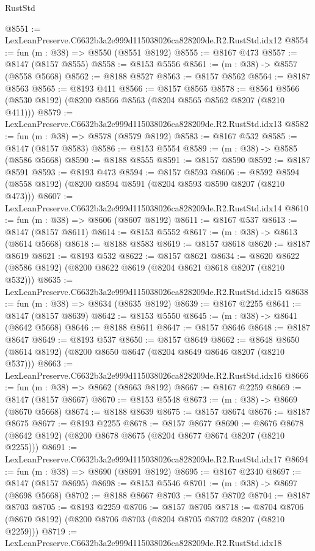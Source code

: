 \begin{lexlean}{RustStd}
\begin{coremodule}
@8551 := LexLeanPreserve.C6632b3a2e999d115038026ca828209de.R2.RustStd.idx12
@8554 := fun (m : @38) => @8550 (@8551 @8192)
@8555 := @8167 @473
@8557 := @8147 (@8157 @8555)
@8558 := @8153 @5556
@8561 := (m : @38) -> @8557 (@8558 @5668)
@8562 := @8188 @8527
@8563 := @8157 @8562
@8564 := @8187 @8563
@8565 := @8193 @411
@8566 := @8157 @8565
@8578 := @8564 @8566 (@8530 @8192) (@8200 @8566 @8563 (@8204 @8565 @8562 @8207 (@8210 @411)))
@8579 := LexLeanPreserve.C6632b3a2e999d115038026ca828209de.R2.RustStd.idx13
@8582 := fun (m : @38) => @8578 (@8579 @8192)
@8583 := @8167 @532
@8585 := @8147 (@8157 @8583)
@8586 := @8153 @5554
@8589 := (m : @38) -> @8585 (@8586 @5668)
@8590 := @8188 @8555
@8591 := @8157 @8590
@8592 := @8187 @8591
@8593 := @8193 @473
@8594 := @8157 @8593
@8606 := @8592 @8594 (@8558 @8192) (@8200 @8594 @8591 (@8204 @8593 @8590 @8207 (@8210 @473)))
@8607 := LexLeanPreserve.C6632b3a2e999d115038026ca828209de.R2.RustStd.idx14
@8610 := fun (m : @38) => @8606 (@8607 @8192)
@8611 := @8167 @537
@8613 := @8147 (@8157 @8611)
@8614 := @8153 @5552
@8617 := (m : @38) -> @8613 (@8614 @5668)
@8618 := @8188 @8583
@8619 := @8157 @8618
@8620 := @8187 @8619
@8621 := @8193 @532
@8622 := @8157 @8621
@8634 := @8620 @8622 (@8586 @8192) (@8200 @8622 @8619 (@8204 @8621 @8618 @8207 (@8210 @532)))
@8635 := LexLeanPreserve.C6632b3a2e999d115038026ca828209de.R2.RustStd.idx15
@8638 := fun (m : @38) => @8634 (@8635 @8192)
@8639 := @8167 @2255
@8641 := @8147 (@8157 @8639)
@8642 := @8153 @5550
@8645 := (m : @38) -> @8641 (@8642 @5668)
@8646 := @8188 @8611
@8647 := @8157 @8646
@8648 := @8187 @8647
@8649 := @8193 @537
@8650 := @8157 @8649
@8662 := @8648 @8650 (@8614 @8192) (@8200 @8650 @8647 (@8204 @8649 @8646 @8207 (@8210 @537)))
@8663 := LexLeanPreserve.C6632b3a2e999d115038026ca828209de.R2.RustStd.idx16
@8666 := fun (m : @38) => @8662 (@8663 @8192)
@8667 := @8167 @2259
@8669 := @8147 (@8157 @8667)
@8670 := @8153 @5548
@8673 := (m : @38) -> @8669 (@8670 @5668)
@8674 := @8188 @8639
@8675 := @8157 @8674
@8676 := @8187 @8675
@8677 := @8193 @2255
@8678 := @8157 @8677
@8690 := @8676 @8678 (@8642 @8192) (@8200 @8678 @8675 (@8204 @8677 @8674 @8207 (@8210 @2255)))
@8691 := LexLeanPreserve.C6632b3a2e999d115038026ca828209de.R2.RustStd.idx17
@8694 := fun (m : @38) => @8690 (@8691 @8192)
@8695 := @8167 @2340
@8697 := @8147 (@8157 @8695)
@8698 := @8153 @5546
@8701 := (m : @38) -> @8697 (@8698 @5668)
@8702 := @8188 @8667
@8703 := @8157 @8702
@8704 := @8187 @8703
@8705 := @8193 @2259
@8706 := @8157 @8705
@8718 := @8704 @8706 (@8670 @8192) (@8200 @8706 @8703 (@8204 @8705 @8702 @8207 (@8210 @2259)))
@8719 := LexLeanPreserve.C6632b3a2e999d115038026ca828209de.R2.RustStd.idx18

\end{coremodule}
\end{lexlean}
